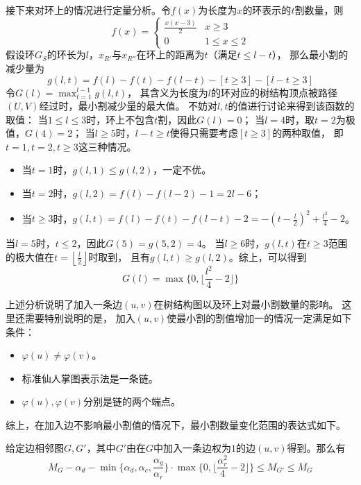 接下来对环上的情况进行定量分析。令$f(x)$为长度为$x$的环表示的$t$割数量，则
\begin{equation}
  f(x)=\begin{cases}
    \frac{x(x-3)}2&x\geq 3\\0&1\leq x\leq 2\end{cases}  
\end{equation}
假设环$G_S$的环长为$l$，$x_{R'}$与$x_{R''}$在环上的距离为$t$（满足$t\leq l-t$），
那么最小割的减少量为
\begin{equation}
  g(l,t)=f(l)-f(t)-f(l-t)-[t\geq 3]-[l-t\geq 3]
\end{equation}
令$G(l)=\max_{t=1}^{l-1}g(l,t)$，
其含义为长度为$l$的环对应的树结构顶点被路径$(U,V)$经过时，最小割减少量的最大值。
不妨对$l,t$的值进行讨论来得到该函数的取值：
当$1\leq l\leq 3$时，环上不包含$t$割，因此$G(l)=0$；
当$l=4$时，取$t=2$为极值，$G(4)=2$；
当$l\geq 5$时，$l-t\geq t$使得只需要考虑$[t\geq 3]$的两种取值，
即$t=1,t=2,t\geq 3$这三种情况。
\begin{itemize}
  \item 当$t=1$时，$g(l,1)\leq g(l,2)$，一定不优。
  \item 当$t=2$时，$g(l,2)=f(l)-f(l-2)-1=2l-6$；
  \item 当$t\geq 3$时，$g(l,t)=f(l)-f(t)-f(l-t)-2=-(t-\frac l2)^2+\frac{l^2}4-2$。
\end{itemize}
当$l=5$时，$t\leq 2$，因此$G(5)=g(5,2)=4$。
当$l\geq 6$时，$g(l,t)$在$t\geq 3$范围的极大值在$t=\left\lfloor\frac l2\right\rfloor$时取到，
且有$g(l,t)\geq g(l,2)$。综上，可以得到
\begin{equation}
  G(l)=\max{\{0,\lfloor\frac{l^2}4-2\rfloor\}}
\end{equation}

上述分析说明了加入一条边$(u,v)$在树结构图以及环上对最小割数量的影响。
这里还需要特别说明的是，
加入$(u,v)$使最小割的割值增加一的情况一定满足如下条件：
\begin{itemize}
  \item $\varphi(u)\neq\varphi(v)$。
  \item 标准仙人掌图表示法是一条链。
  \item $\varphi(u),\varphi(v)$分别是链的两个端点。
\end{itemize}
综上，在加入边不影响最小割值的情况下，最小割数量变化范围的表达式如下。

\begin{theorem}
    给定边相邻图$G,G'$，其中$G'$由在$G$中加入一条边权为$1$的边$(u,v)$得到。那么有
    \begin{equation}
      M_G-\alpha_d-\min{\{\alpha_d,\alpha_c,\frac{\alpha_g}{\alpha_r}\}}·\max{\{0,\lfloor\frac{\alpha_r^2}4-2\rfloor\}} \leq M_{G'}\leq M_G
    \end{equation}

\end{theorem}

